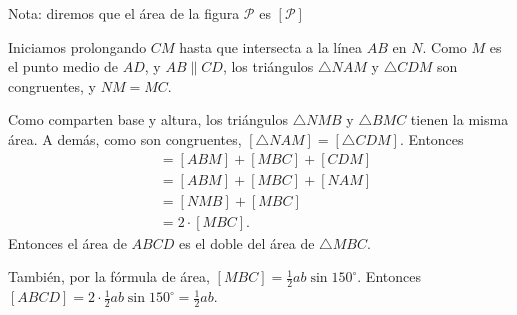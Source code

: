 Nota: diremos que el área de la figura $\mathcal{P}$ es $[\mathcal{P}]$

Iniciamos prolongando $CM$ hasta que intersecta a la línea $AB$ en $N$. 
Como $M$ es el punto medio de $AD$, y $AB\parallel CD$, los triángulos 
$\bigtriangleup NAM$ y $\bigtriangleup CDM$ son congruentes, y 
$NM=MC$. 

Como comparten base y altura, los triángulos $\bigtriangleup NMB$ 
y $\bigtriangleup BMC$ tienen la misma área. A demás, como son congruentes, 
$[\bigtriangleup NAM]=[\bigtriangleup CDM]$. Entonces 
\begin{align*}
[ABCD]&=[ABM]+[MBC]+[CDM]\\
&=[ABM]+[MBC]+[NAM]\\
&=[NMB]+[MBC]\\
&=2\cdot[MBC].
\end{align*}
Entonces el área de $ABCD$ es el doble del área de 
$\bigtriangleup MBC$.

También, por la fórmula de área, $[MBC]=\frac12 ab \sin{150^{\circ}}$.
Entonces $[ABCD]=2\cdot\frac12 ab \sin{150^{\circ}}= \boxed{\frac12ab}$.
